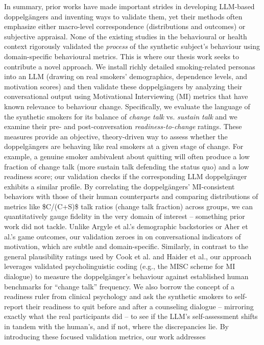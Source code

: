 In summary, prior works have made important strides in developing LLM-based
doppelgängers and inventing ways to validate them, yet their methods often emphasize
either macro-level correspondence (distributions and outcomes) or subjective appraisal.
None of the existing studies in the behavioural or health context rigorously validated
the \emph{process} of the synthetic subject’s behaviour using domain-specific
behavioural metrics. This is where our thesis work seeks to contribute a novel
approach. We install richly detailed smoking-related personas into an LLM (drawing on
real smokers’ demographics, dependence levels, and motivation scores) and then validate
these doppelgängers by analyzing their conversational output using Motivational
Interviewing (MI) metrics that have known relevance to behaviour change. Specifically,
we evaluate the language of the synthetic smokers for its balance of \textit{change
	talk} vs. \textit{sustain talk} and we examine their pre- and post-conversation
\textit{readiness-to-change} ratings. These measures provide an objective,
theory-driven way to assess whether the doppelgängers are behaving like real smokers at
a given stage of change. For example, a genuine smoker ambivalent about quitting will
often produce a low fraction of change talk (more sustain talk defending the status
quo) and a low readiness score; our validation checks if the corresponding LLM
doppelgänger exhibits a similar profile. By correlating the doppelgängers’
MI-consistent behaviors with those of their human counterparts and comparing
distributions of metrics like \$C/(C+S)\$ talk ratios (change talk fraction) across
groups, we can quantitatively gauge fidelity in the very domain of interest – something
prior work did not tackle. Unlike Argyle et al.’s demographic backstories or Aher et
al.’s game outcomes, our validation zeroes in on conversational indicators of
motivation, which are subtle and domain-specific. Similarly, in contrast to the general
plausibility ratings used by Cook et al. and Haider et al., our approach leverages
validated psycholinguistic coding (e.g., the MISC scheme for MI dialogue) to measure
the doppelgänger’s behaviour against established human benchmarks for “change talk”
frequency. We also borrow the concept of a readiness ruler from clinical psychology and
ask the synthetic smokers to self-report their readiness to quit before and after a
counseling dialogue – mirroring exactly what the real participants did – to see if the
LLM’s self-assessment shifts in tandem with the human’s, and if not, where the
discrepancies lie. By introducing these focused validation metrics, our work addresses
